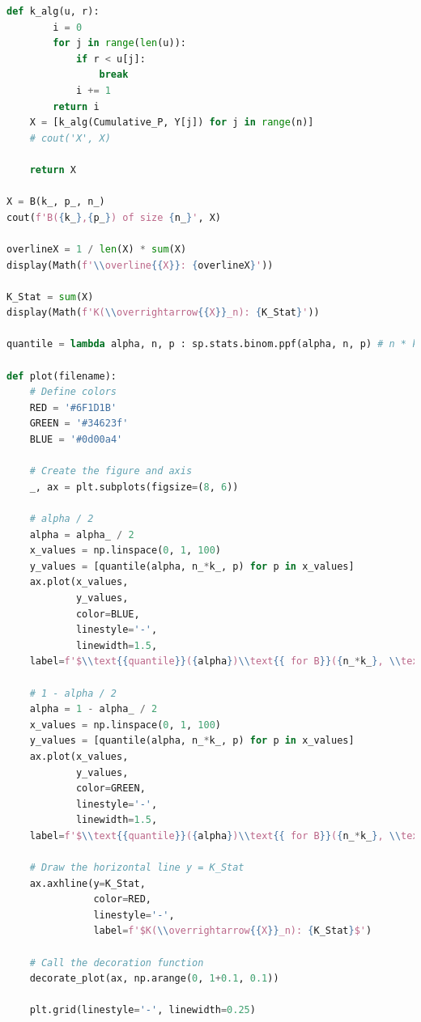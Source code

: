 \documentclass[a4paper, 14pt]{extarticle}
\begin{document}
\begin{center}
\begin{lstlisting}[language=Python]
    def k_alg(u, r):
        i = 0
        for j in range(len(u)):
            if r < u[j]:
                break
            i += 1
        return i
    X = [k_alg(Cumulative_P, Y[j]) for j in range(n)]
    # cout('X', X)

    return X

X = B(k_, p_, n_)
cout(f'B({k_},{p_}) of size {n_}', X)

overlineX = 1 / len(X) * sum(X)
display(Math(f'\\overline{{X}}: {overlineX}'))

K_Stat = sum(X)
display(Math(f'K(\\overrightarrow{{X}}_n): {K_Stat}'))

quantile = lambda alpha, n, p : sp.stats.binom.ppf(alpha, n, p) # n * k

def plot(filename):
    # Define colors
    RED = '#6F1D1B'
    GREEN = '#34623f'
    BLUE = '#0d00a4'

    # Create the figure and axis
    _, ax = plt.subplots(figsize=(8, 6))

    # alpha / 2
    alpha = alpha_ / 2
    x_values = np.linspace(0, 1, 100)
    y_values = [quantile(alpha, n_*k_, p) for p in x_values]
    ax.plot(x_values, 
            y_values, 
            color=BLUE, 
            linestyle='-', 
            linewidth=1.5, 
    label=f'$\\text{{quantile}}({alpha})\\text{{ for B}}({n_*k_}, \\text{{p}})$')

    # 1 - alpha / 2
    alpha = 1 - alpha_ / 2
    x_values = np.linspace(0, 1, 100)
    y_values = [quantile(alpha, n_*k_, p) for p in x_values]
    ax.plot(x_values, 
            y_values, 
            color=GREEN, 
            linestyle='-', 
            linewidth=1.5, 
    label=f'$\\text{{quantile}}({alpha})\\text{{ for B}}({n_*k_}, \\text{{p}})$')

    # Draw the horizontal line y = K_Stat
    ax.axhline(y=K_Stat, 
               color=RED, 
               linestyle='-', 
               label=f'$K(\\overrightarrow{{X}}_n): {K_Stat}$')

    # Call the decoration function
    decorate_plot(ax, np.arange(0, 1+0.1, 0.1))

    plt.grid(linestyle='-', linewidth=0.25)


\end{lstlisting}
\end{center}
\end{document}
